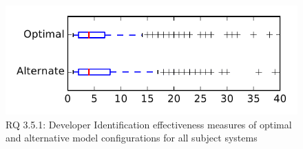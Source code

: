 
\begin{figure}
\centering
\includegraphics[height=0.4\textheight]{figures/combo/dit_rq1_tiny}
\caption{RQ 3.5.1: Developer Identification effectiveness measures of optimal and alternative model configurations for all subject systems}
\label{fig:combo:dit:rq1:tiny}
\end{figure}
